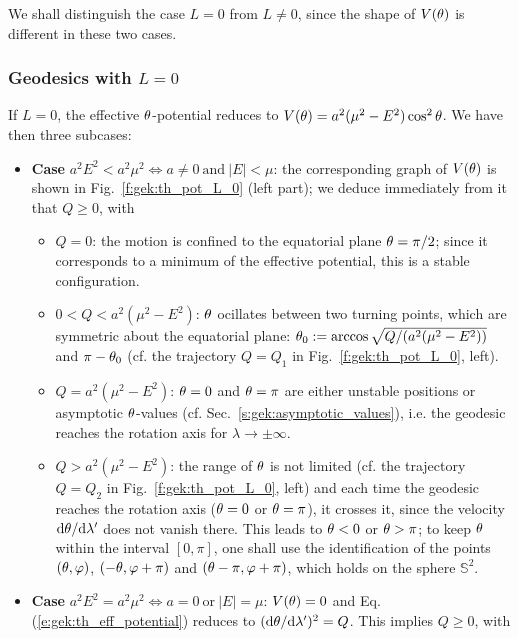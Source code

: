 We shall distinguish the
case $L=0$ from $L\not=0$, since the shape of $V(\theta)$
is different in these two cases.



\subsubsection{Geodesics with $L=0$}

If $L=0$, the effective $\theta$-potential reduces to $V(\theta)=a^2(\mu^2 - E^2)\cos^2\theta$.
We have then three subcases:

\begin{itemize}
\item \textbf{Case} $a^2 E^2 < a^2 \mu^2 \iff a\neq 0 \ \mbox{and}\ |E| < \mu$:
the corresponding graph of $V(\theta)$ is shown in
Fig.~\ref{f:gek:th_pot_L_0} (left part); we deduce immediately from it that
$Q\geq 0$, with
\begin{itemize}
\item $Q=0$: the motion is confined to the equatorial
plane $\theta=\pi/2$; since it corresponds to a minimum of the effective potential, this
is a stable configuration.
\item $0<Q< a^2(\mu^2 - E^2)$: $\theta$ ocillates between
two turning points, which are symmetric about the equatorial plane:
$\theta_0 := \arccos\sqrt{Q/(a^2(\mu^2 - E^2))}$
and $\pi-\theta_0$ (cf. the trajectory $Q=Q_1$ in Fig.~\ref{f:gek:th_pot_L_0}, left).
\item $Q = a^2(\mu^2 - E^2)$: $\theta=0$ and $\theta=\pi$
are either unstable positions or
asymptotic $\theta$-values (cf. Sec.~\ref{s:gek:asymptotic_values}), i.e.
the geodesic reaches the rotation axis for $\lambda\to\pm\infty$.
\item $Q > a^2(\mu^2 - E^2)$:
the range of $\theta$ is not limited (cf. the trajectory $Q=Q_2$ in Fig.~\ref{f:gek:th_pot_L_0}, left)
and each time the geodesic reaches the
rotation axis ($\theta=0$ or $\theta=\pi$),
it crosses it, since the velocity $\mathrm{d}\theta / \mathrm{d}\lambda'$
does not vanish there. This leads to $\theta < 0$ or $\theta > \pi$; to keep $\theta$
within the interval $[0,\pi]$, one shall use the identification
of the points $(\theta, \varphi)$, $(-\theta, \varphi+\pi)$ and $(\theta-\pi, \varphi+\pi)$,
which holds on the sphere $\mathbb{S}^2$.
\end{itemize}
\item \textbf{Case} $a^2 E^2 = a^2\mu^2 \iff a=0\ \mbox{or}\ |E|=\mu$:
$V(\theta)=0$ and Eq.(\ref{e:gek:th_eff_potential})
reduces to $(\mathrm{d}\theta/\mathrm{d}\lambda')^2 = Q$. This implies $Q\geq 0$, with
\begin{itemize}

\end{itemize}
\end{itemize}
